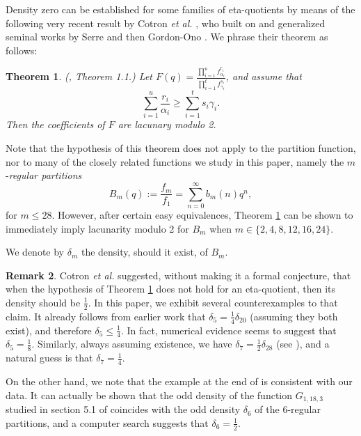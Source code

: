 \documentclass[12pt]{amsart}
\newtheorem{theorem}{Theorem}%
\theoremstyle{definition}
\newtheorem{remark}[theorem]{Remark}
\begin{document}
Density zero can be established for some families of eta-quotients by means of the following very recent result by Cotron \emph{et al.} \cite{CMSZ}, who built on and generalized seminal works by Serre \cite{Serre} and then Gordon-Ono \cite{GO}. We phrase their theorem as follows:
\begin{theorem}\label{cot}(\cite{CMSZ}, Theorem 1.1.)
Let $F(q)=\frac{\prod_{i=1}^uf_{\alpha_i}^{r_i}}{\prod_{i=1}^tf_{\gamma_i}^{s_i}}$, and assume that
$$\sum_{i=1}^u \frac{r_i}{\alpha_i} \ge \sum_{i=1}^t s_i\gamma_i.$$
Then the coefficients of $F$ are lacunary modulo 2.
\end{theorem}

Note that the hypothesis of this theorem does not apply to the partition function, nor to many of the closely related functions we study in this paper, namely the $m$-\emph{regular partitions} $$B_m(q) := \frac{f_m}{f_1} = \sum_{n=0}^\infty b_m(n) q^n,$$ for $m \leq 28$.  However, after certain easy equivalences, Theorem \ref{cot} can be shown to immediately imply lacunarity modulo 2 for $B_m$ when $m \in \{ 2, 4, 8, 12, 16, 24\}$.

We denote by $\delta_m$ the density, should it exist, of $B_m$.

\begin{remark} Cotron \emph{et al.} \cite{CMSZ} suggested, without making it a formal conjecture, that when the hypothesis of Theorem \ref{cot} does not hold for an eta-quotient, then its density should be $\frac{1}{2}$. In this paper, we exhibit several counterexamples to that claim.  It already follows from earlier work \cite{HS1,JKZ} that $\delta_5 = \frac{1}{4} \delta_{20}$ (assuming they both exist), and therefore $\delta_5 \leq \frac{1}{4}$. In fact, numerical evidence seems to suggest that $\delta_5 = \frac{1}{8}$. Similarly, always assuming existence, we have $\delta_7 = \frac{1}{2}\delta_{28}$ (see \cite{JKZ}), and a natural guess is that $\delta_7=\frac{1}{4}$.

On the other hand, we note that the example at the end of \cite{CMSZ} is consistent with our data. It can actually be shown that the odd density of the function $G_{1,18,3}$ studied in section 5.1 of \cite{CMSZ} coincides with the odd density $\delta_6$ of the 6-regular partitions, and a computer search suggests that $\delta_6=\frac{1}{2}$.
\end{remark}
\end{document}
